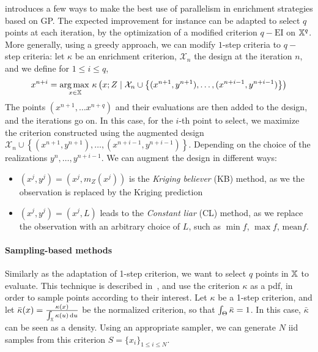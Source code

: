 \documentclass[../../Main_ManuscritThese.tex]{subfiles}
\begin{document}
\cite{ginsbourger_kriging_2010} introduces a few ways to  make the best use of parallelism in enrichment strategies based on GP. The expected improvement for instance can be adapted to select $q$ points at each iteration, by the optimization of a modified criterion $q-\mathrm{EI}$ on $\mathbb{X}^q$. More generally, using a greedy approach, we can modify $1$-step criteria to $q-$step criteria: let $\kappa$ be an enrichment criterion, $\mathcal{X}_n$ the design at the iteration $n$,  and we define for $1\leq i \leq q$, 
\begin{equation} 
 x^{n+i} = \operatorname*{arg\,max \,}_{x \in \mathbb{X}} \kappa\left(x; Z \mid \mathcal{X}_n\cup\left\{(x^{n+1}, y^{n+1}), \dots ,( x^{n+i-1}, y^{n+i-1})\right\} \right)
\end{equation}
The points $(x^{n+1},\dots x^{n+q})$ and their evaluations are then added to the design, and the iterations go on.
In this case, for the $i$-th point to select, we maximize the criterion constructed using the augmented design $\mathcal{X}_n \cup  \left\{(x^{n+1}, y^{n+1}), \dots ,( x^{n+i-1}, y^{n+i-1})\right\}$. Depending on the choice of the realizations $y^{n},\dots,y^{n+i-1}$. We can augment the design in different ways:
\begin{itemize}
\item $\left(x^j, y^j\right) = \left(x^j, m_Z(x^j)\right)$ is the \emph{Kriging believer} (KB) method, as we the observation is replaced by the Kriging prediction
\item $\left(x^j, y^j\right) = \left(x^j, L\right)$ leads to the \emph{Constant liar} (CL) method, as we replace the observation with an arbitrary choice of $L$, such as $\min f$, $\max f$, $\mathrm{mean} f$.
\end{itemize}

\paragraph{Sampling-based methods}
\label{sec:sampling_based_criterion}
Similarly as the adaptation of 1-step criterion, we want to select $q$ points in $\mathbb{X}$ to evaluate.
This technique is described in~\cite{dubourg_reliability-based_2011}, and use the criterion $\kappa$ as a pdf, in order to sample points according to their interest.
Let $\kappa$ be a 1-step criterion, and let $\bar{\kappa}(x) = \frac{\kappa(x)}{\int_{\mathbb{X}}\kappa(u)\,\mathrm{d}u}$ be the normalized criterion, so that $\int_{\Theta} \bar{\kappa}=1$. In this case, $\bar{\kappa}$ can be seen as a density.  Using an appropriate sampler, we can generate $N$ iid samples from this criterion $S=\{x_i\}_{1\leq i \leq N}$. 
  
\end{document}
